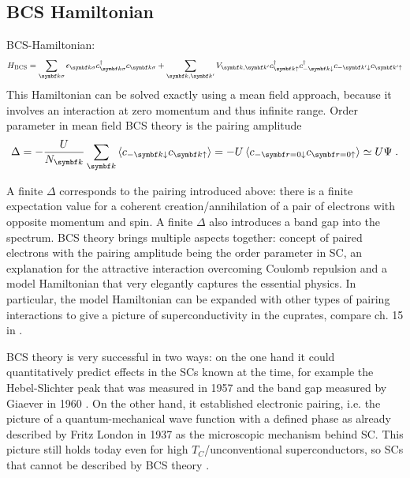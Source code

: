 \documentclass[../notes.tex]{subfiles}
\begin{document}

\subsection*{BCS Hamiltonian}


BCS-Hamiltonian:
\begin{equation}\label{eq:BCS Hamiltonian}
	H_{\text{BCS}} = \sum_{\vb{k}\sigma} \epsilon_{\vb{k}\sigma} c_{\vb{k}\sigma}^{\dagger} c_{\vb{k}\sigma} + \sum_{\vb{k}, \vb{k}^{\prime}} V_{\vb{k}, \vb{k}^{\prime}} c_{\vb{k}\uparrow}^{\dagger} c_{-\vb{k}\downarrow}^{\dagger} c_{-\vb{k}^{\prime}\downarrow} c_{\vb{k}^{\prime}\uparrow}
\end{equation}
This Hamiltonian can be solved exactly using a mean field approach, because it involves an interaction at zero momentum and thus infinite range.
Order parameter in mean field BCS theory is the pairing amplitude
\begin{equation}
	\Delta = - \frac{U}{N_{\vb{k}}} \sum_{\vb{k}} \braket{c_{-\vb{k} \downarrow} c_{\vb{k} \uparrow}} = - U \braket{c_{-\vb{r}=0 \downarrow} c_{\vb{r=0} \uparrow}} \simeq U \Psi \;.
\end{equation}

A finite \(\Delta\) corresponds to the pairing introduced above: there is a finite expectation value for a coherent creation/annihilation of a pair of electrons with opposite momentum and spin.
A finite \(\Delta\) also introduces a band gap into the spectrum.
BCS theory brings multiple aspects together: concept of paired electrons with the pairing amplitude being the order parameter in SC, an explanation for the attractive interaction overcoming Coulomb repulsion and a model Hamiltonian that very elegantly captures the essential physics.
In particular, the model Hamiltonian can be expanded with other types of pairing interactions to give a picture of superconductivity in the cuprates, compare ch. 15 in \cite{colemanIntroductionManyBodyPhysics2015}.

BCS theory is very successful in two ways: on the one hand it could quantitatively predict effects in the SCs known at the time, for example the Hebel-Slichter peak that was measured in 1957 \cite{hebelNuclearRelaxationSuperconducting1957, hebelNuclearSpinRelaxation1959} and the band gap measured by Giaever in 1960 \cite{giaeverStudySuperconductorsElectron1961}.  
On the other hand, it established electronic pairing, i.e. the picture of a quantum-mechanical wave function with a defined phase as already described by Fritz London in 1937 \cite{londonNewConceptionSupraconductivity1937} as the microscopic mechanism behind SC.
This picture still holds today even for high \(T_C\)/unconventional superconductors, so SCs that cannot be described by BCS theory \cite{zhouHightemperatureSuperconductivity2021}.
\end{document}
